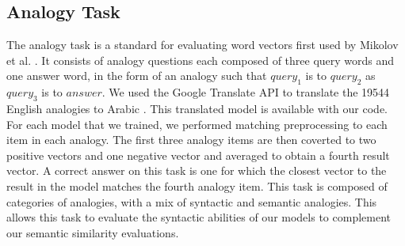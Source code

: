 \subsection{Analogy Task}

The analogy task is a standard for evaluating word vectors first used by Mikolov et al. \cite{mikoloveffic:2013}. It consists of analogy questions each composed of three query words and one answer word, in the form of an analogy such that $query_1$ is to $query_2$ as $query_3$ is to $answer$. We used the Google Translate API to translate the 19544 English analogies to Arabic \cite{google:online}. This translated model is available with our code. For each model that we trained, we performed matching preprocessing to each item in each analogy. The first three analogy items are then coverted to two positive vectors and one negative vector and averaged to obtain a fourth result vector. A correct answer on this task is one for which the closest vector to the result in the model matches the fourth analogy item.
This task is composed of categories of analogies, with a mix of syntactic and semantic analogies. This allows this task to evaluate the syntactic abilities of our models to complement our semantic similarity evaluations. 






